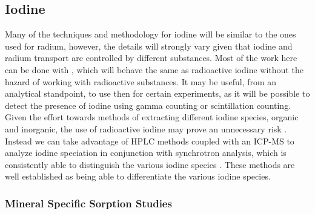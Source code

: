 \documentclass[twoside,12pt,titlepage]{article}
\newcommand{\isotope}[2]{\ch{^{#1}#2}}
\begin{document}
\subsection{Iodine}

Many of the techniques and methodology for iodine will be similar to the ones used for radium, however, the details will strongly vary given that iodine and radium transport are controlled by different substances. Most of the work here can be done with \isotope{127}{I}, which will behave the same as radioactive iodine without the hazard of working with radioactive substances. It may be useful, from an analytical standpoint, to use \isotope{I}{129} then for certain experiments, as it will be possible to detect the presence of iodine using gamma counting or scintillation counting. Given the effort towards methods of extracting different iodine species, organic and inorganic, the use of radioactive iodine may prove an unnecessary risk \cite{Wuilloud2005}. Instead we can take advantage of HPLC methods coupled with an ICP-MS to analyze iodine speciation in conjunction with synchrotron analysis, which is consistently able to distinguish the various iodine species \cite{Yamaguchi2008}. These methods are well established as being able to differentiate the various iodine species.

\subsubsection{Mineral Specific Sorption Studies}
\end{document}
